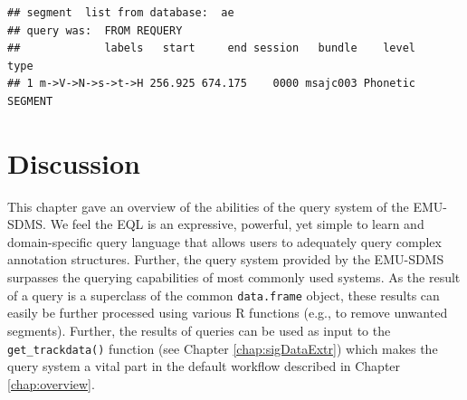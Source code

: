 \documentclass[]{book}
\theoremstyle{definition}
\theoremstyle{definition}
\theoremstyle{definition}
\theoremstyle{remark}
\begin{document}
\begin{verbatim}
## segment  list from database:  ae 
## query was:  FROM REQUERY 
##             labels   start     end session   bundle    level    type
## 1 m->V->N->s->t->H 256.925 674.175    0000 msajc003 Phonetic SEGMENT
\end{verbatim}

\hypertarget{discussion}{%
\section{Discussion}\label{discussion}}

This chapter gave an overview of the abilities of the query system of
the EMU-SDMS. We feel the EQL is an expressive, powerful, yet simple to
learn and domain-specific query language that allows users to adequately
query complex annotation structures. Further, the query system provided
by the EMU-SDMS surpasses the querying capabilities of most commonly
used systems. As the result of a query is a superclass of the common
\texttt{data.frame} object, these results can easily be further
processed using various R functions (e.g., to remove unwanted segments).
Further, the results of queries can be used as input to the
\texttt{get\_trackdata()} function (see Chapter \ref{chap:sigDataExtr})
which makes the query system a vital part in the default workflow
described in Chapter \ref{chap:overview}.
\end{document}
